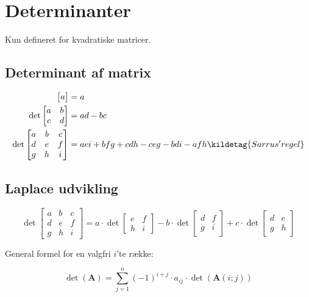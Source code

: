 \section{Determinanter}
Kun defineret for kvadratiske matricer.

\subsection{Determinant af matrix}
\begin{align*}
    \begin{bmatrix}
        a
    \end{bmatrix} &= a \\
    \det
    \begin{bmatrix}
        a & b \\
        c & d
    \end{bmatrix}
    &=
    ad - bc \\
    \det
    \begin{bmatrix}
        a & b & c \\
        d & e & f \\
        g & h & i
    \end{bmatrix}
    &=
    aei + bfg + cdh - ceg - bdi - afh
    \kildetag{Sarrus' regel}
\end{align*}

\subsection{Laplace udvikling}
\[
\det
\begin{bmatrix}
    a & b & c \\
    d & e & f \\
    g & h & i
\end{bmatrix}
=
a \cdot \det \begin{bmatrix}
    e & f \\
    h & i
\end{bmatrix} - 
b \cdot \det \begin{bmatrix}
    d & f \\
    g & i
\end{bmatrix} +
c \cdot \det \begin{bmatrix}
    d & e \\
    g & h
\end{bmatrix}
\]


General formel for en valgfri $i$'te række:

\[
    \det(\mathbf{A}) = \sum_{j=1}^{n} (-1)^{i+j} \cdot a_{ij} \cdot \det(\mathbf{A}(i;j))
\]

